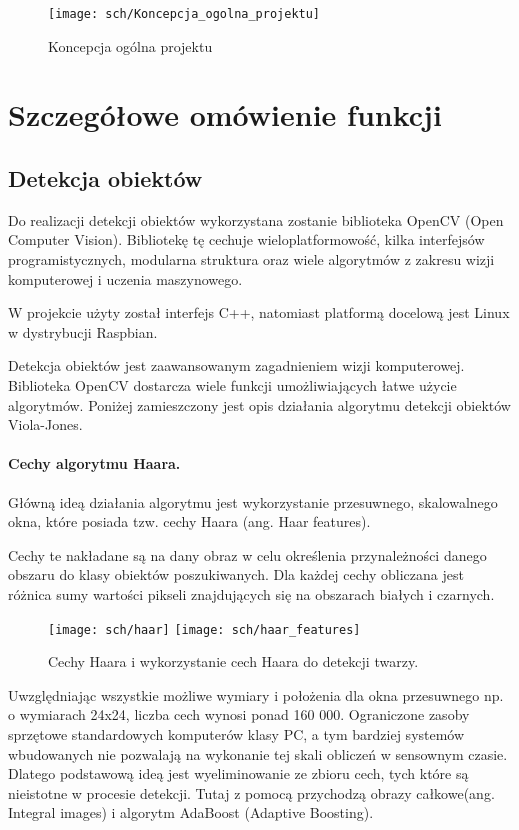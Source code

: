 \begin{figure}[bth]
\centering
{\texttt{[image: sch/Koncepcja\_ogolna\_projektu]}}
\caption[Koncepcja ogólna projektu]{Koncepcja ogólna projektu}
\label{fig:sch2}
\end{figure}

\section{Szczegółowe omówienie funkcji}
\subsection{Detekcja obiektów}
Do realizacji detekcji obiektów wykorzystana zostanie biblioteka OpenCV (Open Computer Vision). Bibliotekę tę cechuje wieloplatformowość, kilka interfejsów programistycznych, modularna struktura oraz wiele algorytmów z zakresu wizji komputerowej i uczenia maszynowego. 

W projekcie użyty został interfejs C++, natomiast platformą docelową jest Linux w dystrybucji Raspbian.

Detekcja obiektów jest zaawansowanym zagadnieniem wizji komputerowej. Biblioteka OpenCV dostarcza wiele funkcji umożliwiających łatwe użycie algorytmów. Poniżej zamieszczony jest opis działania  algorytmu detekcji obiektów Viola-Jones.
 
\paragraph{Cechy algorytmu Haara.} Główną ideą działania algorytmu jest wykorzystanie przesuwnego, skalowalnego okna, które posiada tzw.  cechy Haara (ang. Haar features). 

Cechy te nakładane są na dany obraz w celu określenia przynależności danego obszaru do klasy obiektów poszukiwanych. Dla każdej cechy obliczana jest różnica sumy wartości pikseli znajdujących się na obszarach białych i czarnych.

\begin{figure}[bth]
\centering
{\texttt{[image: sch/haar]}}
{\texttt{[image: sch/haar\_features]}} \\
\caption[ Cechy Haara i wykorzystanie cech Haara do detekcji twarzy.]{Cechy Haara i wykorzystanie cech Haara do detekcji twarzy.}
\label{fig:sch2}
\end{figure}

Uwzględniając wszystkie możliwe wymiary i położenia dla okna przesuwnego np. o wymiarach 24x24, liczba cech wynosi ponad 160 000. Ograniczone zasoby sprzętowe standardowych komputerów klasy PC, a tym bardziej systemów wbudowanych nie pozwalają na wykonanie tej skali obliczeń w sensownym czasie. Dlatego podstawową ideą jest wyeliminowanie ze zbioru cech, tych które są nieistotne w procesie detekcji. Tutaj z pomocą przychodzą obrazy całkowe(ang. Integral images) i algorytm AdaBoost (Adaptive Boosting).

